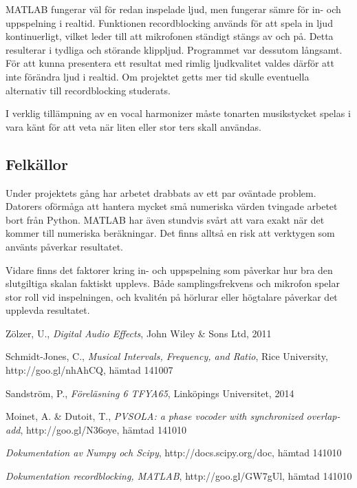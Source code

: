\documentclass[12pt,a4paper]{article}
\begin{document}
MATLAB fungerar väl för redan inspelade ljud, men fungerar sämre för in- och uppspelning i realtid. Funktionen recordblocking \cite{bib:recordb} används för att spela in ljud kontinuerligt, vilket leder till att mikrofonen ständigt stängs av och på. Detta resulterar i tydliga och störande klippljud. Programmet var dessutom långsamt. För att kunna presentera ett resultat med rimlig ljudkvalitet valdes därför att inte förändra ljud i realtid. Om projektet getts mer tid skulle eventuella alternativ till recordblocking studerats.

I verklig tillämpning av en vocal harmonizer måste tonarten musikstycket spelas i vara känt för att veta när liten eller stor ters skall användas.

\subsection{Felkällor}

Under projektets gång har arbetet drabbats av ett par oväntade problem. Datorers oförmåga att hantera mycket små numeriska värden tvingade arbetet bort från Python. MATLAB har även stundvis svårt att vara exakt när det kommer till numeriska beräkningar. Det finns alltså en risk att verktygen som använts påverkar resultatet.

Vidare finns det faktorer kring in- och uppspelning som påverkar hur bra den slutgiltiga skalan faktiskt upplevs. Både samplingsfrekvens och mikrofon spelar stor roll vid inspelningen, och kvalitén på hörlurar eller högtalare påverkar det upplevda resultatet.

\begin{thebibliography}{99}

  Zölzer, U.,
  \emph{Digital Audio Effects},
  John Wiley \& Sons Ltd, 2011

  Schmidt-Jones, C.,
  \emph{Musical Intervals, Frequency, and Ratio},
  Rice University,
  http://goo.gl/nhAhCQ,
  hämtad 141007

  Sandström, P.,
  \emph{Föreläsning 6 TFYA65},
  Linköpings Universitet, 2014

  Moinet, A. \& Dutoit, T.,
  \emph{PVSOLA: a phase vocoder with synchronized overlap-add},
  http://goo.gl/N36oye,
  hämtad 141010

  \emph{Dokumentation av Numpy och Scipy},
  http://docs.scipy.org/doc,
  hämtad 141010

  \emph{Dokumentation recordblocking, MATLAB},
  http://goo.gl/GW7gUl,
  hämtad 141010

\end{thebibliography}
\end{document}
